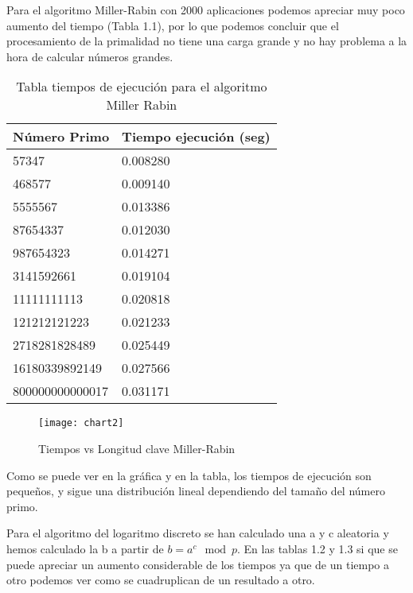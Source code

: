 Para el algoritmo Miller-Rabin con 2000 aplicaciones podemos apreciar muy poco aumento del tiempo (Tabla 1.1), por lo que podemos concluir que el procesamiento de la primalidad no tiene una carga grande y no hay problema a la hora de calcular números grandes.
\begin{table}[htbp]
	\begin{center}
		\begin{tabular}{|l|l|}
			\hline
			\rowcolor{LightCyan}
			Número Primo & Tiempo ejecución (seg) \\ \hline
			57347&  0.008280 \\ \hline 
			468577&  0.009140 \\ \hline 
			5555567&  0.013386 \\ \hline 
			87654337&  0.012030 \\ \hline 
			987654323&  0.014271 \\ \hline 
			3141592661&  0.019104 \\ \hline 
			11111111113&  0.020818 \\ \hline 
			121212121223&  0.021233 \\ \hline 
			2718281828489&  0.025449 \\ \hline 
			16180339892149&  0.027566 \\ \hline 
			800000000000017&  0.031171 \\ \hline 
		\end{tabular}
		\caption{Tabla tiempos de ejecución para el algoritmo Miller Rabin}
		\label{tabla:millerrabin}
	\end{center}
\end{table}

\begin{figure}[H]
	\begin{center}
		\texttt{[image: chart2]}
		\caption{Tiempos vs Longitud clave Miller-Rabin}
		\label{figura: tiempos3}
	\end{center}
\end{figure}

Como se puede ver en la gráfica y en la tabla, los tiempos de ejecución son pequeños, y sigue una distribución lineal dependiendo del tamaño del número primo. 

Para el algoritmo del logaritmo discreto se han calculado una a y c aleatoria y hemos calculado la b a partir de $b = a^c\mod p$. En las tablas 1.2 y 1.3 si que se puede apreciar un aumento considerable de los tiempos ya que de un tiempo a otro podemos ver como se cuadruplican de un resultado a otro. \\

